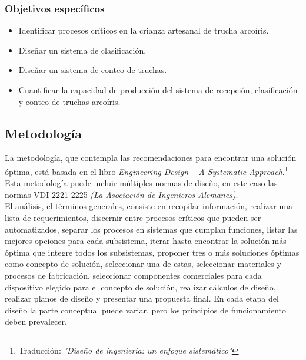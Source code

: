 \subsubsection{Objetivos específicos}

\begin{itemize}
\item Identificar procesos críticos en la crianza artesanal de trucha arcoíris.
\item Diseñar un sistema de clasificación.
\item Diseñar un sistema de conteo de truchas.
\item Cuantificar la capacidad de producción del sistema de recepción, clasificación y conteo de truchas arcoíris.
\end{itemize}

\subsection{Metodología}

La metodología, que contempla las recomendaciones para encontrar una solución óptima, está basada en el libro \textit{Engineering Design – A Systematic Approach}.\footnote{Traducción: \textit{"Diseño de ingeniería: un enfoque sistemático"}}  Esta metodología puede incluir múltiples normas de diseño, en este caso las normas VDI 2221-2225 \textit{(La Asociación de Ingenieros Alemanes)}.  \\

El análisis, el términos generales, consiste en recopilar información, realizar una lista de requerimientos, discernir entre procesos críticos que pueden ser automatizados, separar los procesos en sistemas que cumplan funciones, listar las mejores opciones para cada subsistema, iterar hasta encontrar la solución más óptima que integre todos los subsistemas, proponer tres o más soluciones óptimas como concepto de solución, seleccionar una de estas, seleccionar materiales y procesos de fabricación, seleccionar componentes comerciales para cada dispositivo elegido para el concepto de solución, realizar cálculos de diseño, realizar planos de diseño y presentar una propuesta final. En cada etapa del diseño la parte conceptual puede variar, pero los principios de funcionamiento deben prevalecer.\\

